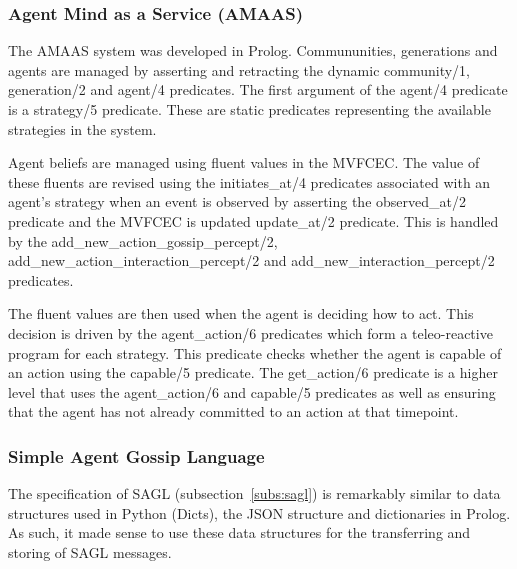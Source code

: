 \documentclass[]{final_report}
\begin{document}
\subsubsection{Agent Mind as a Service (AMAAS)}
The AMAAS system was developed in Prolog. Commununities, generations and agents are managed by asserting and retracting the dynamic community/1, generation/2 and agent/4 predicates. The first argument of the agent/4 predicate is a strategy/5 predicate. These are static predicates representing the available strategies in the system.\par 
Agent beliefs are managed using fluent values in the MVFCEC. The value of these fluents are revised using the initiates\_at/4 predicates associated with an agent's strategy when an event is observed by asserting the observed\_at/2 predicate and the MVFCEC is updated update\_at/2 predicate. This is handled by the add\_new\_action\_gossip\_percept/2, add\_new\_action\_interaction\_percept/2 and add\_new\_interaction\_percept/2 predicates.\par 
The fluent values are then used when the agent is deciding how to act. This decision is driven by the agent\_action/6 predicates which form a teleo-reactive program for each strategy. This predicate checks whether the agent is capable of an action using the capable/5 predicate. The get\_action/6 predicate is a higher level that uses the agent\_action/6 and capable/5 predicates as well as ensuring that the agent has not already committed to an action at that timepoint.

\subsubsection{Simple Agent Gossip Language}
The specification of SAGL (subsection~\ref{subs:sagl}) is remarkably similar to data structures used in Python (Dicts), the JSON structure and dictionaries in Prolog. As such, it made sense to use these data structures for the transferring and storing of SAGL messages.
\end{document}
